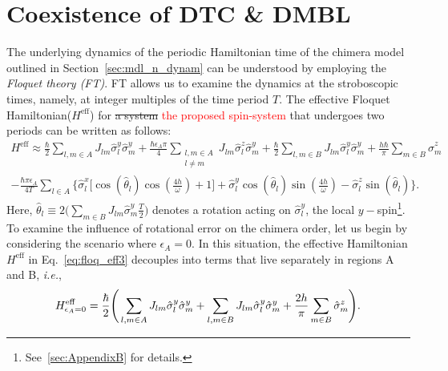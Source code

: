 \documentclass[12pt]{iopart}
\newcommand{\red}[1]{\textcolor{red}{#1}}
\begin{document}
\section{\label{sec:level3}Coexistence of DTC \& DMBL}	
The underlying dynamics of the periodic Hamiltonian time of the chimera model outlined in Section~\ref{sec:mdl_n_dynam} can be understood by employing the \textit{ Floquet theory (FT)}. FT allows us to examine the dynamics at the stroboscopic times, namely, at integer multiples of the time period $T$. The effective Floquet Hamiltonian($H^{\mathrm{eff}}$) for \sout{a system} \red{the proposed spin-system} that undergoes two periods can be written as follows:
\begin{multline}
    H^{\mathrm{eff}} \approx\frac{\hbar}{2} \sum_{l,m\in A}J_{lm}\hat{\sigma}_l^y\hat{\sigma}_m^y +\frac{\hbar \epsilon_A \pi}{4} \sum_{\substack{l,m\in A\\l\neq m}} J_{lm}\hat{\sigma}^z_l\hat{\sigma}^y_m + \frac{\hbar}{2}\sum_{l,m\in B}J_{lm}\hat{\sigma}_l^y \hat{\sigma}_m^y + \frac{h\hbar}{\pi}\sum_{m \in B}\hat{\sigma}^z_m \\ -\frac{\hbar \pi \epsilon_A}{4T}\sum_{l\in A}\Bigg\{\hat{\sigma}^x_l \bigg[\cos(\hat{\theta}_l)\cos(\frac{4h}{\omega})+1 \bigg] + \hat{\sigma}^y_l \cos(\hat{\theta}_l)\sin(\frac{4h}{\omega})-\hat{\sigma}^z_l \sin(\hat{\theta}_l)\Bigg\}.
    \label{eq:floq_eff3}
\end{multline}
Here, $\displaystyle \hat{\theta}_l \equiv 2 \Big(\sum_{m \in B}J_{lm}\hat{\sigma}^y_m \frac{T}{2} \Big)$ denotes a rotation acting on $\hat{\sigma}^y_l$, the local $y-$spin\footnote{See~\ref{sec:AppendixB} for details.}. 
To examine the influence of rotational error on the chimera order, let us begin by considering the scenario where $\epsilon_A=0$. In this situation, the effective Hamiltonian $H^\mathrm{eff}$ in Eq.~\eqref{eq:floq_eff3}  decouples into terms that live separately in regions A and B, \textit{i.e.},
\begin{equation}
    H^{\mathrm{eff}}_{\epsilon_A=0} =  \frac{\hbar}{2}\Bigg( \sum_{l,m\in A} J_{lm} \hat{\sigma}^y_l\hat{\sigma}^y_m +\sum_{l,m\in B} J_{lm} \hat{\sigma}^y_l\hat{\sigma}^y_m\\+\frac{2h }{\pi}\sum_{m \in B}\hat{\sigma}^z_m\Bigg).
\end{equation}
	
\end{document}
